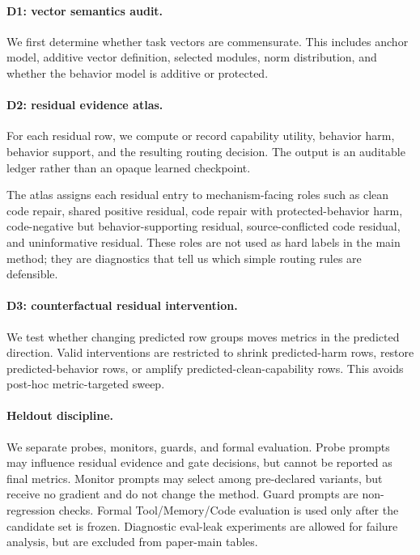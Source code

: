 \documentclass{article}
\begin{document}
\paragraph{D1: vector semantics audit.}
We first determine whether task vectors are commensurate.  This includes anchor model, additive vector definition, selected modules, norm distribution, and whether the behavior model is additive or protected.

\paragraph{D2: residual evidence atlas.}
For each residual row, we compute or record capability utility, behavior harm, behavior support, and the resulting routing decision.  The output is an auditable ledger rather than an opaque learned checkpoint.

The atlas assigns each residual entry to mechanism-facing roles such as clean code repair, shared positive residual, code repair with protected-behavior harm, code-negative but behavior-supporting residual, source-conflicted code residual, and uninformative residual.  These roles are not used as hard labels in the main method; they are diagnostics that tell us which simple routing rules are defensible.

\paragraph{D3: counterfactual residual intervention.}
We test whether changing predicted row groups moves metrics in the predicted direction.  Valid interventions are restricted to shrink predicted-harm rows, restore predicted-behavior rows, or amplify predicted-clean-capability rows.  This avoids post-hoc metric-targeted sweep.

\paragraph{Heldout discipline.}
We separate probes, monitors, guards, and formal evaluation.  Probe prompts may influence residual evidence and gate decisions, but cannot be reported as final metrics.  Monitor prompts may select among pre-declared variants, but receive no gradient and do not change the method.  Guard prompts are non-regression checks.  Formal Tool/Memory/Code evaluation is used only after the candidate set is frozen.  Diagnostic eval-leak experiments are allowed for failure analysis, but are excluded from paper-main tables.
\end{document}
